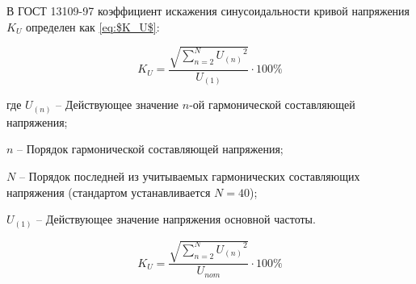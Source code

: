 
В ГОСТ 13109-97 \cite{ГОСТ13109-97} коэффициент искажения синусоидальности кривой напряжения $K_U$ определен как \eqref{eq:$K_U$}:

\begin{equation}
\label{eq:$K_U$}
K_U = \frac{\sqrt{\sum_{n=2}^N {U_{(n)}}^2}}{U_{(1)}}\cdot 100 \%
\end{equation}

где $U_{(n)}$ -- Действующее значение $n$-ой гармонической составляющей напряжения;

$n$ -- Порядок гармонической составляющей напряжения;

$N$ -- Порядок последней из учитываемых гармонических составляющих напряжения (стандартом устанавливается $N=40$);

$U_{(1)}$ -- Действующее значение напряжения основной частоты.

\begin{equation}
\label{eq:$K_U2$}
K_U = \frac{\sqrt{\sum_{n=2}^N {U_{(n)}}^2}}{U_{nom}}\cdot 100 \%
\end{equation}

